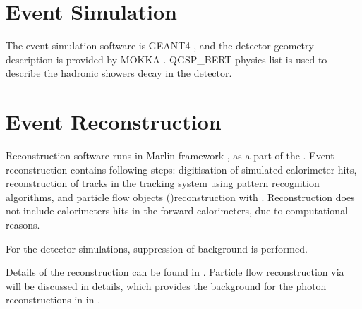 \section{Event Simulation}

The event simulation software is GEANT4 \cite{Agostinelli:2002hh}, and the detector geometry description is provided by MOKKA \cite{MoradeFreitas:2002kj}.  QGSP\_BERT physics list is used to describe the hadronic showers decay in the detector.




\section{Event Reconstruction}

Reconstruction software runs in Marlin framework \cite{Gaede:2006pj}, as a part of the \ilcsoft. Event reconstruction contains following steps: digitisation of simulated calorimeter hits, reconstruction of tracks in the tracking system using pattern recognition algorithms, and particle flow objects (\PFOs)reconstruction with \pandora\cite{Thomson:2009rp,Marshall:2012ry}. Reconstruction does not include calorimeters hits in the forward calorimeters, due to computational reasons.

For the \CLIC detector simulations, suppression of \ggHad background is performed.

Details of the reconstruction can be found in \cite{Brau:2007zza,Linssen:2012hp}. Particle flow reconstruction via \pandora will be discussed in details, which provides the background for the photon reconstructions in \pandora in .



